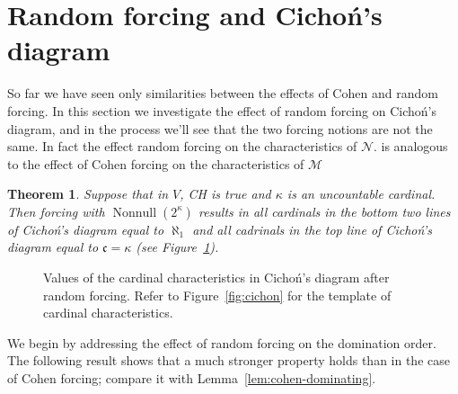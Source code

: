 \documentclass[11pt,oneside]{amsbook}
\newcommand{\Null}{\mathcal N}
\newcommand{\Meager}{\mathcal M}
\DeclareMathOperator{\Nonnull}{Nonnull}
\theoremstyle{definition}
\theoremstyle{plain}
\newtheorem{theorem}{Theorem}[section]
\theoremstyle{definition}
\theoremstyle{remark}
\numberwithin{equation}{section}
\numberwithin{figure}{section}
\begin{document}


\newpage
\section{Random forcing and Cicho\'n's diagram}

So far we have seen only similarities between the effects of Cohen and random forcing. In this section we investigate the effect of random forcing on Cicho\'n's diagram, and in the process we'll see that the two forcing notions are not the same. In fact the effect random forcing on the characteristics of $\Null$.  is analogous to the effect of Cohen forcing on the characteristics of $\Meager$

\begin{theorem}
  \label{thm:random-cichon}
  Suppose that in $V$, CH is true and $\kappa$ is an uncountable cardinal. Then forcing with $\Nonnull(2^\kappa)$ results in all cardinals in the bottom two lines of Cicho\'n's diagram equal to $\aleph_1$ and all cadrinals in the top line of Cicho\'n's diagram equal to $\mathfrak c=\kappa$ (see Figure~\ref{fig:cichon-random}).
\end{theorem}

\begin{figure}[h]
  \caption{Values of the cardinal characteristics in Cicho\'n's diagram after random forcing. Refer to Figure~\ref{fig:cichon} for the template of cardinal characteristics.\label{fig:cichon-random}}
\end{figure}

We begin by addressing the effect of random forcing on the domination order. The following result shows that a much stronger property holds than in the case of Cohen forcing; compare it with Lemma~\ref{lem:cohen-dominating}.
\end{document}
